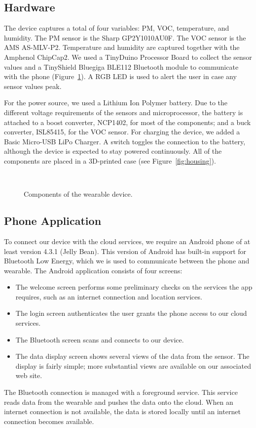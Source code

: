 \documentclass{sigchi}
\begin{document}
\subsection{Hardware}
The device captures a total of four variables: PM, VOC, temperature, and humidity.
The PM sensor is the Sharp GP2Y1010AU0F.
The VOC sensor is the AMS AS-MLV-P2.
Temperature and humidity are captured together with the Amphenol ChipCap2.
We used a TinyDuino Processor Board to collect the sensor values and a TinyShield Bluegiga BLE112 Bluetooth module to communicate with the phone (Figure~\ref{fig:hardware block}).
A RGB LED is used to alert the user in case any sensor values peak.

For the power source, we used a Lithium Ion Polymer battery.
Due to the different voltage requirements of the sensors and microprocessor, the battery is attached to a boost converter, NCP1402, for most of the components; and a buck converter, ISL85415, for the VOC sensor.
For charging the device, we added a Basic Micro-USB LiPo Charger.
A switch toggles the connection to the battery, although the device is expected to stay powered continuously.
All of the components are placed in a 3D-printed case (see Figure~\ref{fig:housing}).
\begin{figure}
    \centering
    
    \caption{Components of the wearable device.}
    ~\label{fig:hardware block}
\end{figure}

\subsection{Phone Application}
To connect our device with the cloud services, we require an Android phone of at least version 4.3.1 (Jelly Bean).
This version of Android has built-in support for Bluetooth Low Energy, which we is used to communicate between the phone and wearable.
The Android application consists of four screens: 
\begin{itemize}
    \item The welcome screen performs some preliminary checks on the services the app requires, such as an internet connection and location services.
    \item The login screen authenticates the user grants the phone access to our cloud services.
    \item The Bluetooth screen scans and connects to our device.
    \item The data display screen shows several views of the data from the sensor.
        The display is fairly simple; more substantial views are available on our associated web site.
\end{itemize}
The Bluetooth connection is managed with a foreground service.
This service reads data from the wearable and pushes the data onto the cloud.
When an internet connection is not available, the data is stored locally until an internet connection becomes available.
\end{document}
